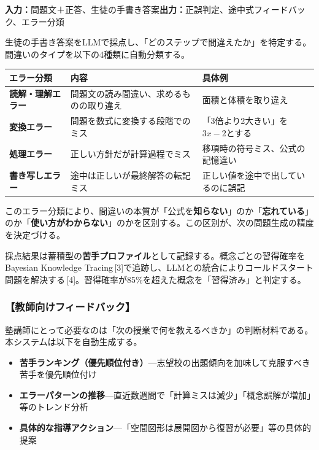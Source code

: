 \documentclass[paper=a4,fontsize=10.5bp,jafontsize=10.5bp]{jlreq}
\begin{document}
\noindent\textbf{入力：}問題文＋正答、生徒の手書き答案\quad\textbf{出力：}正誤判定、途中式フィードバック、エラー分類

生徒の手書き答案をLLMで採点し、「どのステップで間違えたか」を特定する。間違いのタイプを以下の4種類に自動分類する。


\begin{footnotesize}\noindent
\begin{tabularx}{\linewidth}{>{\bfseries}l X X}
\toprule
エラー分類 & 内容 & 具体例 \\
\midrule
読解・理解エラー & 問題文の読み間違い、求めるものの取り違え & 面積と体積を取り違え \\
変換エラー & 問題を数式に変換する段階でのミス & 「3倍より2大きい」を$3x-2$とする \\
処理エラー & 正しい方針だが計算過程でミス & 移項時の符号ミス、公式の記憶違い \\
書き写しエラー & 途中は正しいが最終解答の転記ミス & 正しい値を途中で出しているのに誤記 \\
\bottomrule
\end{tabularx}
\end{footnotesize}


このエラー分類により、間違いの本質が「公式を\textbf{知らない}」のか「\textbf{忘れている}」のか「\textbf{使い方がわからない}」のかを区別する。この区別が、次の問題生成の精度を決定づける。

採点結果は蓄積型の\textbf{苦手プロファイル}として記録する。概念ごとの習得確率をBayesian Knowledge Tracing\,[3]で追跡し、LLMとの統合によりコールドスタート問題を解決する\,[4]。習得確率が85\%を超えた概念を「習得済み」と判定する。

\subsubsection{【教師向けフィードバック】}

塾講師にとって必要なのは「次の授業で何を教えるべきか」の判断材料である。本システムは以下を自動生成する。

\begin{itemize}
  \item \textbf{苦手ランキング（優先順位付き）}---志望校の出題傾向を加味して克服すべき苦手を優先順位付け
  \item \textbf{エラーパターンの推移}---直近数週間で「計算ミスは減少」「概念誤解が増加」等のトレンド分析
  \item \textbf{具体的な指導アクション}---「空間図形は展開図から復習が必要」等の具体的提案
\end{itemize}
\end{document}
